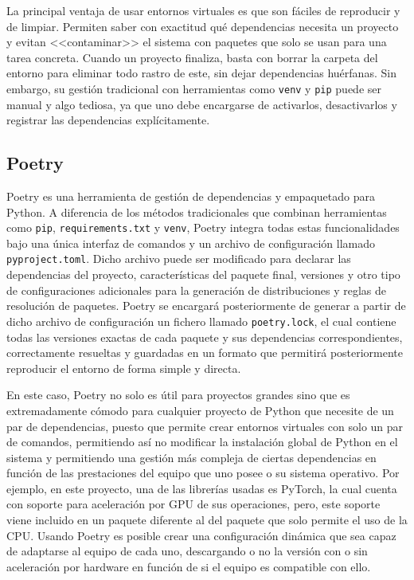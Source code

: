 La principal ventaja de usar entornos virtuales es que son fáciles de reproducir y de limpiar. Permiten saber con exactitud qué dependencias necesita un proyecto y evitan <<contaminar>> el sistema con paquetes que solo se usan para una tarea concreta. Cuando un proyecto finaliza, basta con borrar la carpeta del entorno para eliminar todo rastro de este, sin dejar dependencias huérfanas. Sin embargo, su gestión tradicional con herramientas como \texttt{venv} y \texttt{pip} puede ser manual y algo tediosa, ya que uno debe encargarse de activarlos, desactivarlos y registrar las dependencias explícitamente.

\subsection{Poetry}


Poetry es una herramienta de gestión de dependencias y empaquetado para Python. A diferencia de los métodos tradicionales que combinan herramientas como \texttt{pip}, \texttt{requirements.txt} y \texttt{venv}, Poetry integra todas estas funcionalidades bajo una única interfaz de comandos y un archivo de configuración llamado \texttt{pyproject.toml}. Dicho archivo puede ser modificado para declarar las dependencias del proyecto, características del paquete final, versiones y otro tipo de configuraciones adicionales para la generación de distribuciones y reglas de resolución de paquetes. Poetry se encargará posteriormente de generar a partir de dicho archivo de configuración un fichero llamado \texttt{poetry.lock}, el cual contiene todas las versiones exactas de cada paquete y sus dependencias correspondientes, correctamente resueltas y guardadas en un formato que permitirá posteriormente reproducir el entorno de forma simple y directa.

En este caso, Poetry no solo es útil para proyectos grandes sino que es extremadamente cómodo para cualquier proyecto de Python que necesite de un par de dependencias, puesto que permite crear entornos virtuales con solo un par de comandos, permitiendo así no modificar la instalación global de Python en el sistema y permitiendo una gestión más compleja de ciertas dependencias en función de las prestaciones del equipo que uno posee o su sistema operativo. Por ejemplo, en este proyecto, una de las librerías usadas es PyTorch, la cual cuenta con soporte para aceleración por GPU de sus operaciones, pero, este soporte viene incluido en un paquete diferente al del paquete que solo permite el uso de la CPU. Usando Poetry es posible crear una configuración dinámica que sea capaz de adaptarse al equipo de cada uno, descargando o no la versión con o sin aceleración por hardware en función de si el equipo es compatible con ello.

